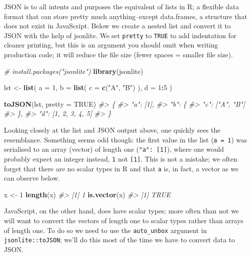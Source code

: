 \documentclass[10pt,]{krantz}
\makeatletter
\newenvironment{Shaded}{\begin{snugshade}}{\end{snugshade}}
\newcommand{\CommentTok}[1]{\textcolor[rgb]{0.37,0.37,0.37}{\textit{#1}}}
\newcommand{\DataTypeTok}[1]{\textcolor[rgb]{0.27,0.27,0.27}{#1}}
\newcommand{\DecValTok}[1]{\textcolor[rgb]{0.06,0.06,0.06}{#1}}
\newcommand{\KeywordTok}[1]{\textcolor[rgb]{0.27,0.27,0.27}{\textbf{#1}}}
\newcommand{\NormalTok}[1]{#1}
\newcommand{\OperatorTok}[1]{\textcolor[rgb]{0.43,0.43,0.43}{\textbf{#1}}}
\newcommand{\OtherTok}[1]{\textcolor[rgb]{0.37,0.37,0.37}{#1}}
\newcommand{\StringTok}[1]{\textcolor[rgb]{0.5,0.5,0.5}{#1}}
\newenvironment{kframe}{%
\medskip{}
\setlength{\fboxsep}{.8em}
 \def\at@end@of@kframe{}%
 \ifinner\ifhmode%
  \def\at@end@of@kframe{\end{minipage}}%
  \begin{minipage}{\columnwidth}%
 \fi\fi%
 \def\FrameCommand##1{\hskip\@totalleftmargin \hskip-\fboxsep
 \colorbox{shadecolor}{##1}\hskip-\fboxsep
     \hskip-\linewidth \hskip-\@totalleftmargin \hskip\columnwidth}%
 \MakeFramed {\advance\hsize-\width
   \@totalleftmargin\z@ \linewidth\hsize
   \@setminipage}}%
 {\par\unskip\endMakeFramed%
 \at@end@of@kframe}
\renewenvironment{Shaded}{\begin{kframe}}{\end{kframe}}
\makeatother
\begin{document}
JSON is to all intents and purposes the equivalent of lists in R; a flexible data format that can store pretty much anything--except data.frames, a structure that does not exist in JavaScript. Below we create a nested list and convert it to JSON with the help of jsonlite. We set \texttt{pretty} to \texttt{TRUE} to add indentation for cleaner printing, but this is an argument you should omit when writing production code; it will reduce the file size (fewer spaces = smaller file size).

\begin{Shaded}
\begin{Highlighting}[]
\CommentTok{# install.packages("jsonlite")}
\KeywordTok{library}\NormalTok{(jsonlite)}

\NormalTok{lst <-}\StringTok{ }\KeywordTok{list}\NormalTok{(}
  \DataTypeTok{a =} \DecValTok{1}\NormalTok{,}
  \DataTypeTok{b =} \KeywordTok{list}\NormalTok{(}
    \DataTypeTok{c =} \KeywordTok{c}\NormalTok{(}\StringTok{"A"}\NormalTok{, }\StringTok{"B"}\NormalTok{)}
\NormalTok{  ),}
  \DataTypeTok{d =} \DecValTok{1}\OperatorTok{:}\DecValTok{5}
\NormalTok{)}

\KeywordTok{toJSON}\NormalTok{(lst, }\DataTypeTok{pretty =} \OtherTok{TRUE}\NormalTok{)}
\CommentTok{#> \{}
\CommentTok{#>   "a": [1],}
\CommentTok{#>   "b": \{}
\CommentTok{#>     "c": ["A", "B"]}
\CommentTok{#>   \},}
\CommentTok{#>   "d": [1, 2, 3, 4, 5]}
\CommentTok{#> \}}
\end{Highlighting}
\end{Shaded}

Looking closely at the list and JSON output above, one quickly sees the resemblance. Something seems odd though: the first value in the list (\texttt{a\ =\ 1}) was serialised to an array (vector) of length one (\texttt{"a":\ {[}1{]}}), where one would probably expect an integer instead, \texttt{1} not \texttt{{[}1{]}}. This is not a mistake; we often forget that there are no scalar types in R and that \texttt{a} is, in fact, a vector as we can observe below.

\begin{Shaded}
\begin{Highlighting}[]
\NormalTok{x <-}\StringTok{ }\DecValTok{1}
\KeywordTok{length}\NormalTok{(x)}
\CommentTok{#> [1] 1}
\KeywordTok{is.vector}\NormalTok{(x)}
\CommentTok{#> [1] TRUE}
\end{Highlighting}
\end{Shaded}

JavaScript, on the other hand, does have scalar types; more often than not we will want to convert the vectors of length one to scalar types rather than arrays of length one. To do so we need to use the \texttt{auto\_unbox} argument in \texttt{jsonlite::toJSON}; we'll do this most of the time we have to convert data to JSON.
\end{document}
